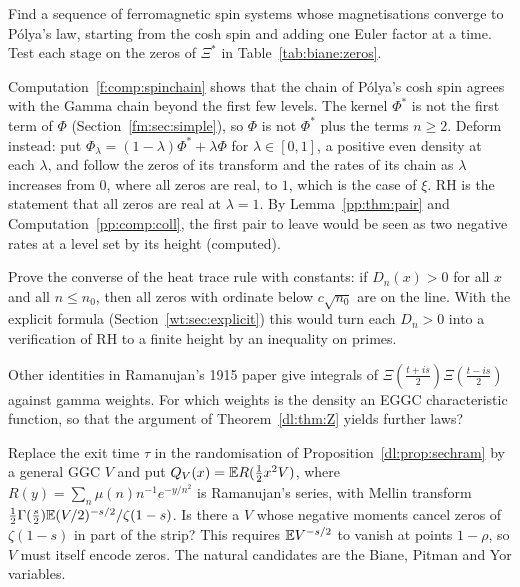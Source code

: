 \begin{openproblem}\label{f:op:ferro}
Find a sequence of ferromagnetic spin systems whose magnetisations converge to P\'olya's law, starting from the cosh spin and adding one Euler factor at a time. Test each stage on the zeros of $\Xi^*$ in Table~\ref{tab:biane:zeros}.
\end{openproblem}

\begin{openproblem}\label{r:op:deform}
Computation~\ref{f:comp:spinchain} shows that the chain of P\'olya's cosh spin agrees with the Gamma chain beyond the first few levels. The kernel $\Phi^*$ is not the first term of $\Phi$ (Section~\ref{fm:sec:simple}), so $\Phi$ is not $\Phi^*$ plus the terms $n\ge2$. Deform instead: put $\Phi_\lambda=(1-\lambda)\Phi^*+\lambda\Phi$ for $\lambda\in[0,1]$, a positive even density at each $\lambda$, and follow the zeros of its transform and the rates of its chain as $\lambda$ increases from $0$, where all zeros are real, to $1$, which is the case of $\xi$. RH is the statement that all zeros are real at $\lambda=1$. By Lemma~\ref{pp:thm:pair} and Computation~\ref{pp:comp:coll}, the first pair to leave would be seen as two negative rates at a level set by its height (computed).
\end{openproblem}

\begin{openproblem}
Prove the converse of the heat trace rule with constants: if $D_n(x)>0$ for all $x$ and all $n\le n_0$, then all zeros with ordinate below $c\sqrt{n_0}$ are on the line. With the explicit formula (Section~\ref{wt:sec:explicit}) this would turn each $D_n>0$ into a verification of RH to a finite height by an inequality on primes.
\end{openproblem}

\begin{openproblem}\label{r:op:Ram}
Other identities in Ramanujan's 1915 paper \cite{Ram15} give integrals of $\Xi(\frac{t+is}{2})\Xi(\frac{t-is}{2})$ against gamma weights. For which weights is the density an EGGC characteristic function, so that the argument of Theorem~\ref{dl:thm:Z} yields further laws?
\end{openproblem}

\begin{openproblem}\label{r:op:V}
Replace the exit time $\tau$ in the randomisation of Proposition~\ref{dl:prop:sechram} by a general GGC $V$ and put $Q_V(x)=\mathbb{E} R(\frac12x^2V)$, where $R(y)=\sum_n\mu(n)n^{-1}e^{-y/n^2}$ is Ramanujan's series, with Mellin transform $\frac12\Gamma(\frac s2)\mathbb{E}(V/2)^{-s/2}/\zeta(1-s)$. Is there a $V$ whose negative moments cancel zeros of $\zeta(1-s)$ in part of the strip? This requires $\mathbb{E} V^{-s/2}$ to vanish at points $1-\rho$, so $V$ must itself encode zeros. The natural candidates are the Biane, Pitman and Yor variables.
\end{openproblem}

